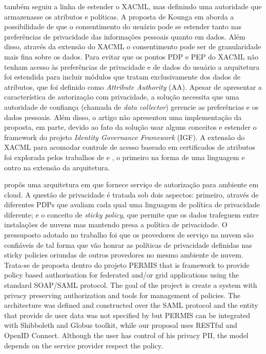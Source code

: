 \documentclass{doublecol-new}
\begin{document}
\cite{kounga2010extending} também seguiu a linha de estender o XACML, mas definindo uma autoridade que armazenasse os atributos e políticas. A proposta de Kounga em \cite{kounga2010extending} aborda a possibilidade de que o consentimento do usuário pode se estender tanto nas preferências de privacidade das informações pessoais quanto em dados. Além disso, através da extensão do XACML o consentimento pode ser de granularidade mais fina sobre os dados. Para evitar que os pontos PDP e PEP do XACML não tenham acesso às preferências de privacidade e de dados do usuário a arquitetura foi estendida para incluir módulos que tratam exclusivamente dos dados de atributos, que foi definido como \textit{Attribute Authority} (AA). Apesar de apresentar a característica de autorização com privacidade, a solução necessita que uma autoridade de confiança (chamada de \textit{data collector}) gerencie as preferências e os dados pessoais. Além disso, o artigo não apresentou uma implementação da proposta, em parte, devido ao fato da solução usar alguns conceitos e estender o framework do projeto \textit{Identity Governance Framework} (IGF). A extensão do XACML para acomodar controle de acesso baseado em certificados de atributos foi explorada pelos trabalhos de \cite{camenisch2009credential} e \cite{dagdee2011extending}, o primeiro na forma de uma linguagem e outro na extensão da arquitetura.

\cite{chadwick2012privacy} propôs uma arquitetura em  que fornece serviço de autorização para ambiente em cloud. A questão de privacidade é tratada sob dois aspectos: primeiro, através de diferentes PDPs que avaliam cada qual uma linguagem de política de privacidade diferente; e o conceito de \textit{sticky policy}, que permite que os dados trafeguem entre instalações de nuvens mas mantendo presa a política de privacidade. O pressuposto adotado no trabalho foi que os provedores de serviço na nuvem são confiáveis de tal forma que vão honrar as políticas de privacidade definidas nas sticky policies oriundas de outros provedores no mesmo ambiente de nuvem. Trata-se de proposta dentro do projeto PERMIS \cite{chadwick2008permis} that is framework to provide policy based authorisation for federated and/or grid applications using the standard SOAP/SAML protocol. The goal of the project is create a system with privacy preserving authorization and tools for management of policies. The architecture was defined and constructed over the SAML protocol and the entity that provide de user data was not specified by \cite{chadwick2012privacy} but PERMIS can be integrated with Shibboleth and Globus toolkit, while our proposal uses RESTful and OpenID Connect. Although the user has control of his privacy PII, the model depends on the service provider respect the policy.
\end{document}
